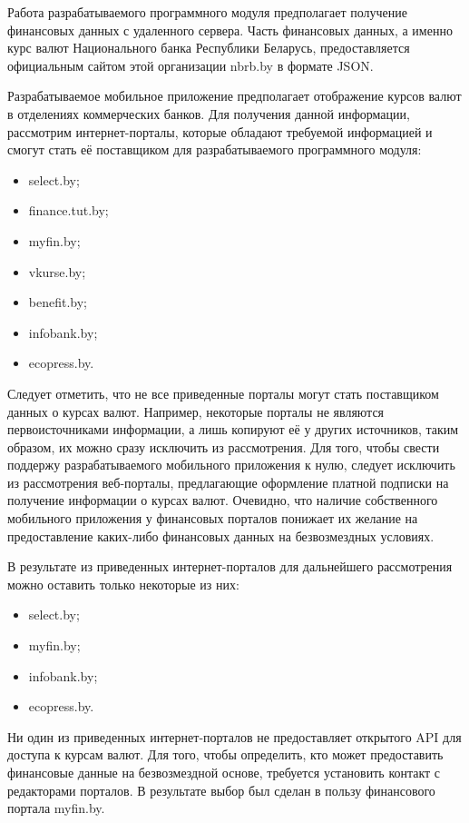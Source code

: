 Работа разрабатываемого программного модуля предполагает получение финансовых
данных с удаленного сервера. Часть финансовых данных, а именно курс валют
Национального банка Республики Беларусь, предоставляется официальным сайтом
этой организации nbrb.by в формате JSON.

Разрабатываемое мобильное приложение предполагает отображение курсов валют
в отделениях коммерческих банков. Для получения данной информации,
рассмотрим интернет-порталы, которые обладают требуемой информацией и
смогут стать её поставщиком для разрабатываемого программного модуля:
\begin{itemize}
  \item select.by;
  \item finance.tut.by;
  \item myfin.by;
  \item vkurse.by;
  \item benefit.by;
  \item infobank.by;
  \item ecopress.by.
\end{itemize}

Следует отметить, что не все приведенные порталы могут стать поставщиком
данных о курсах валют. Например, некоторые порталы не являются первоисточниками
информации, а лишь копируют её у других источников, таким образом, их можно сразу
исключить из рассмотрения. Для того, чтобы свести поддержу разрабатываемого
мобильного приложения к нулю, следует исключить из рассмотрения веб-порталы,
предлагающие оформление платной подписки на получение информации о курсах валют.
Очевидно, что наличие собственного мобильного приложения у финансовых порталов
понижает их желание на предоставление каких-либо финансовых данных на
безвозмездных условиях.

В результате из приведенных интернет-порталов для дальнейшего
рассмотрения можно оставить только некоторые из них:
\begin{itemize}
  \item select.by;
  \item myfin.by;
  \item infobank.by;
  \item ecopress.by.
\end{itemize}

Ни один из приведенных интернет-порталов не
предоставляет открытого API для доступа к курсам валют. Для того, чтобы определить,
кто может предоставить финансовые данные на безвозмездной основе, требуется
установить контакт с редакторами порталов. В результате выбор был сделан в
пользу финансового портала myfin.by.

